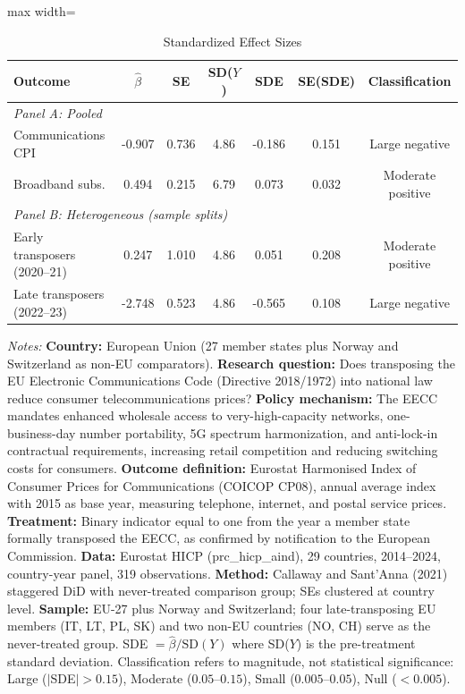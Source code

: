 \begin{table}[htbp]
\centering
\caption{Standardized Effect Sizes}
\label{tab:sde}
\begin{adjustbox}{max width=\textwidth}
\begin{tabular}{lcccccc}
\hline\hline
Outcome & $\hat{\beta}$ & SE & SD($Y$) & SDE & SE(SDE) & Classification \\
\hline
\multicolumn{7}{l}{\textit{Panel A: Pooled}} \\[3pt]
Communications CPI & -0.907 & 0.736 & 4.86 & -0.186 & 0.151 & Large negative \\
Broadband subs. & 0.494 & 0.215 & 6.79 & 0.073 & 0.032 & Moderate positive \\
[6pt]
\multicolumn{7}{l}{\textit{Panel B: Heterogeneous (sample splits)}} \\[3pt]
Early transposers (2020--21) & 0.247 & 1.010 & 4.86 & 0.051 & 0.208 & Moderate positive \\
Late transposers (2022--23) & -2.748 & 0.523 & 4.86 & -0.565 & 0.108 & Large negative \\
\hline\hline
\end{tabular}
\end{adjustbox}
\par\vspace{0.3em}
\begin{minipage}{\textwidth}
{\footnotesize \textit{Notes:} \textbf{Country:} European Union (27 member states plus Norway and Switzerland as non-EU comparators). \textbf{Research question:} Does transposing the EU Electronic Communications Code (Directive 2018/1972) into national law reduce consumer telecommunications prices? \textbf{Policy mechanism:} The EECC mandates enhanced wholesale access to very-high-capacity networks, one-business-day number portability, 5G spectrum harmonization, and anti-lock-in contractual requirements, increasing retail competition and reducing switching costs for consumers. \textbf{Outcome definition:} Eurostat Harmonised Index of Consumer Prices for Communications (COICOP CP08), annual average index with 2015 as base year, measuring telephone, internet, and postal service prices. \textbf{Treatment:} Binary indicator equal to one from the year a member state formally transposed the EECC, as confirmed by notification to the European Commission. \textbf{Data:} Eurostat HICP (prc\_hicp\_aind), 29 countries, 2014--2024, country-year panel, 319 observations. \textbf{Method:} Callaway and Sant'Anna (2021) staggered DiD with never-treated comparison group; SEs clustered at country level. \textbf{Sample:} EU-27 plus Norway and Switzerland; four late-transposing EU members (IT, LT, PL, SK) and two non-EU countries (NO, CH) serve as the never-treated group. SDE $= \hat{\beta} / \text{SD}(Y)$ where SD($Y$) is the pre-treatment standard deviation. Classification refers to magnitude, not statistical significance: Large ($|$SDE$| > 0.15$), Moderate ($0.05$--$0.15$), Small ($0.005$--$0.05$), Null ($< 0.005$).}
\end{minipage}
\end{table}
